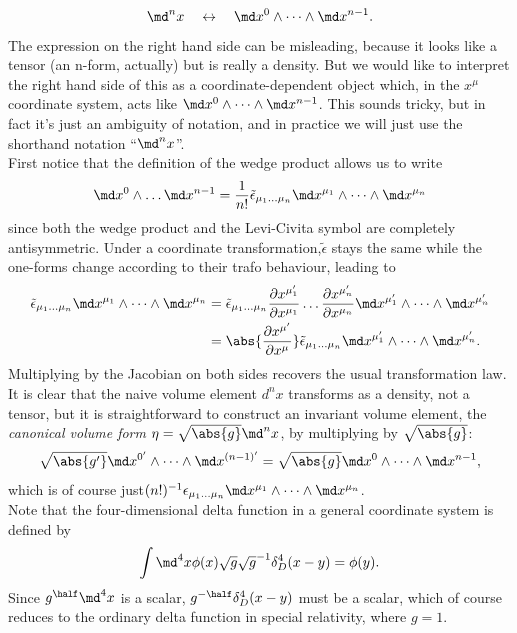 \begin{equation}
	\md^n x \quad \leftrightarrow \quad \md x^0 \wedge \dots \wedge \md x^{n-1}.
\end{equation}
The expression on the right hand side can be misleading, because it looks like a tensor (an
n-form, actually) but is really a density. But we would like to interpret
the right hand side of this as a coordinate-dependent object which, in the $x^μ$ coordinate
system, acts like $\md x^0 \wedge \dots \wedge \md x^{n-1}$. This sounds tricky, but in fact it’s just an ambiguity of
notation, and in practice we will just use the shorthand notation “$\md^n x$”.\\
First notice that the definition of the wedge product allows us to write 
\begin{equation}
	\md x^0 \wedge \dots \md x^{n-1} = \frac{1}{n!} \tilde{\epsilon}_{\mu_1 \dots \mu_n} \md x^{\mu_1} \wedge \dots \wedge \md x^{\mu_n}
\end{equation}
since both the wedge product and the Levi-Civita symbol are completely antisymmetric. Under a coordinate transformation,$\tilde{\epsilon}$ stays the same while the one-forms change according to their trafo behaviour, leading to
\begin{align}
	\tilde{\epsilon}_{\mu_1 \dots \mu_n} \md x^{\mu_1} \wedge \dots \wedge \md x^{\mu_n} &=  
	\tilde{\epsilon}_{\mu_1 \dots \mu_n} \frac{\partial x^{\mu^\prime_1}}{\partial x^{\mu_1}} \dots \frac{\partial x^{\mu^\prime_n}}{\partial x^{\mu_n}} \md x^{\mu^\prime_1} \wedge \dots \wedge \md x^{\mu^\prime_n} \\	
	&= \abs{\frac{\partial x^{\mu^\prime}}{\partial x^{\mu}}}   \tilde{\epsilon}_{\mu_1 \dots \mu_n} \md x^{\mu^\prime_1} \wedge \dots \wedge \md x^{\mu^\prime_n} .
\end{align}
Multiplying by the Jacobian on both sides recovers the usual transformation law.
It is clear that the naive volume element $d^n x$ transforms as a density, not a tensor,
but it is straightforward to construct an invariant volume element, the \emph{canonical volume form} $\eta = \sqrt{\abs{g}} \md^n x$, by multiplying by $\sqrt{\abs{g}}$:
\begin{equation}
	\sqrt{\abs{g^\prime}} \md x^{0^\prime} \wedge \dots \wedge \md x^{(n-1)^\prime} = \sqrt{\abs{g}} \md x^0 \wedge \dots \wedge \md x^{n-1},
\end{equation}
which is of course just$(n!)^{-1} \epsilon_{\mu_1 \dots \mu_n} \md x^{\mu_1} \wedge \dots \wedge \md x^{\mu_n}$.
\\
Note that the four-dimensional delta function in a general coordinate system is defined by
\begin{equation}
	\int \md^4 x   \phi(x) \sqrt{g}\sqrt{g}^{-1}\delta^4_D(x-y) = \phi(y).
\end{equation}
Since $g^\half \md^4x$ is a scalar, $g^{-\half}\delta^4_D(x-y)$ must be a scalar, which of course reduces to the ordinary delta function in special relativity, where $g=1$.

